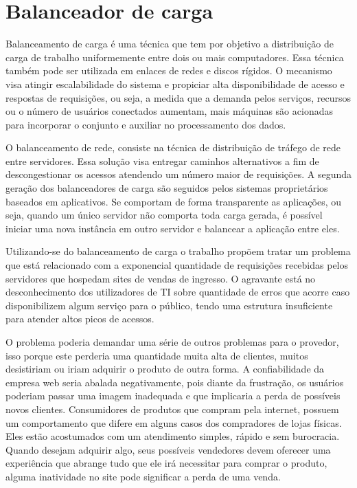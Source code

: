 \chapter{Balanceador de carga}

Balanceamento de carga é uma técnica que tem por objetivo a distribuição de carga de trabalho uniformemente entre dois ou 
mais computadores. Essa técnica também pode ser utilizada em enlaces de redes e discos rígidos. O mecanismo visa atingir
escalabilidade do sistema e propiciar alta disponibilidade de acesso e respostas de requisições, ou seja, a medida que a
demanda pelos serviços, recursos ou o número de usuários conectados aumentam, mais máquinas são acionadas para incorporar
o conjunto e auxiliar no processamento dos dados.


O balanceamento de rede, consiste na técnica de distribuição de tráfego de rede entre servidores. Essa solução visa entregar
caminhos alternativos a fim de descongestionar os acessos atendendo um número maior de requisições. A segunda geração dos
balanceadores de carga são seguidos pelos sistemas proprietários baseados em aplicativos. Se comportam de forma transparente
as aplicações, ou seja, quando um único servidor não comporta toda carga gerada, é possível iniciar uma nova instância em 
outro servidor e balancear a aplicação entre eles.


Utilizando-se do balanceamento de carga o trabalho propõem tratar um problema que está relacionado com a exponencial
quantidade de requisições recebidas pelos servidores que hospedam sites de vendas de ingresso. O agravante está no
desconhecimento dos utilizadores de TI sobre quantidade de erros que acorre caso disponibilizem algum serviço para o 
público, tendo uma estrutura insuficiente para atender altos picos de acessos.


O problema poderia demandar uma série de outros problemas para o provedor, isso porque este perderia uma quantidade muita
alta de clientes, muitos desistiriam ou iriam adquirir o produto de outra forma. A confiabilidade da empresa web seria
abalada negativamente, pois diante da frustração, os usuários poderiam passar uma imagem inadequada e que implicaria a perda
de possíveis novos clientes. Consumidores de produtos que compram pela internet, possuem um comportamento que difere em
alguns casos dos compradores de lojas físicas. Eles estão acostumados com um atendimento simples, rápido e sem burocracia.
Quando desejam adquirir algo, seus possíveis vendedores devem oferecer uma experiência que abrange tudo que ele irá
necessitar para comprar o produto, alguma inatividade no site pode significar a perda de uma venda.


